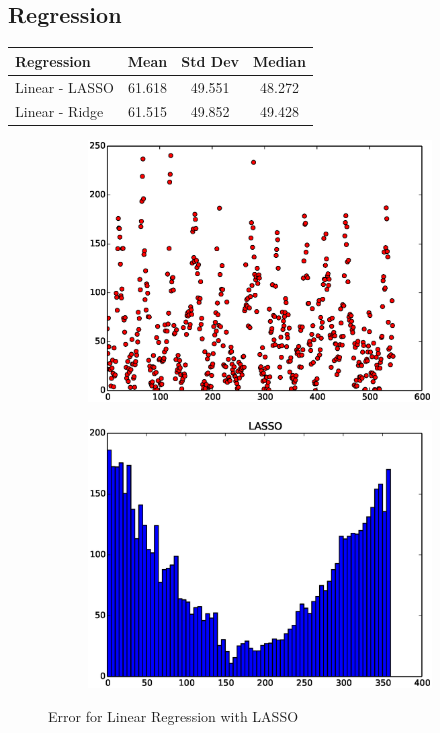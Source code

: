 \documentclass{article}
\begin{document}
\subsection{Regression}

\begin{center}
\begin{tabular}{l|c|c|c}
Regression & Mean & Std Dev & Median\\
\hline
Linear - LASSO & 61.618 & 49.551 & 48.272 \\
Linear - Ridge & 61.515 & 49.852 & 49.428
\end{tabular}
\end{center}

\begin{figure}[H]
  \begin{subfigure}[!h]{0.5\textwidth}
    \centering
    \includegraphics[width=\textwidth]{./woodley/LASSO_heading_plot.eps}
    \label{img:woodley_sample}
  \end{subfigure}
  \begin{subfigure}[!h]{0.5\textwidth}
    \centering
    \includegraphics[width=\textwidth]{./woodley/LASSO_heading_bar.eps}
    \label{img:woodley_features}
  \end{subfigure}
  \caption{Error for Linear Regression with LASSO}
\end{figure}
\end{document}
